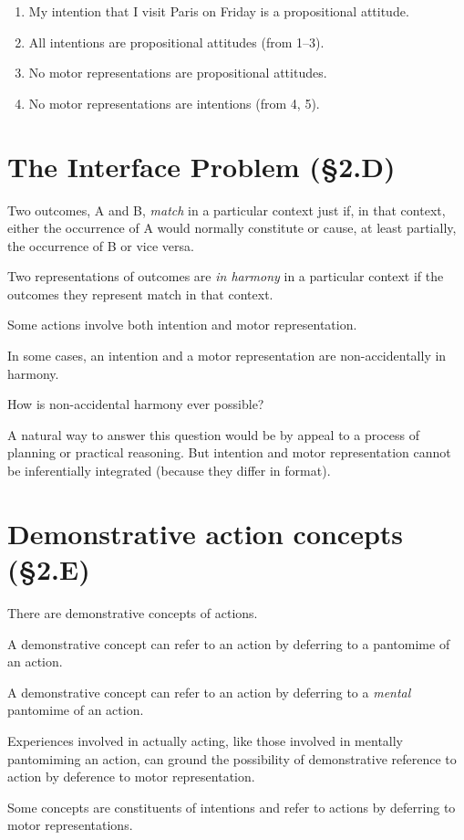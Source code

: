 \documentclass[11pt]{extarticle}
\begin{document}
\begin{multicols}{3}
\begin{enumerate}
\item My intention that I visit Paris on Friday is a propositional attitude.

\item All intentions are propositional attitudes (from 1--3).

\item No motor representations are propositional attitudes.

\item No motor representations are intentions (from 4, 5).
\end{enumerate}





\section{The Interface Problem (§2.D)}
Two  outcomes, A and B, \emph{match} in a particular context just if, in that context, either the occurrence of A would normally constitute or cause, at least partially, the occurrence of B or vice versa. 

Two representations of outcomes are \emph{in harmony} in a particular context if the outcomes they represent match in that context.

Some actions involve both  intention and motor representation.

In some cases, an intention and a motor representation are non-accidentally in harmony.

How is non-accidental harmony ever possible?

A natural way to answer this question would be by appeal to a process of planning or practical reasoning.
But intention and motor representation cannot be inferentially integrated (because they differ in format).  


\section{Demonstrative action concepts (§2.E)}
There are demonstrative concepts of actions.

A demonstrative concept can refer to an action by deferring to a pantomime of an action.

A demonstrative concept can refer to an action by deferring to a \emph{mental} pantomime of an action.

Experiences involved in actually acting, like those involved in mentally pantomiming an action, can ground the possibility of demonstrative reference to action by deference to motor representation.

Some concepts are constituents of intentions and refer to actions by deferring to motor representations.



\end{multicols}
\end{document}
